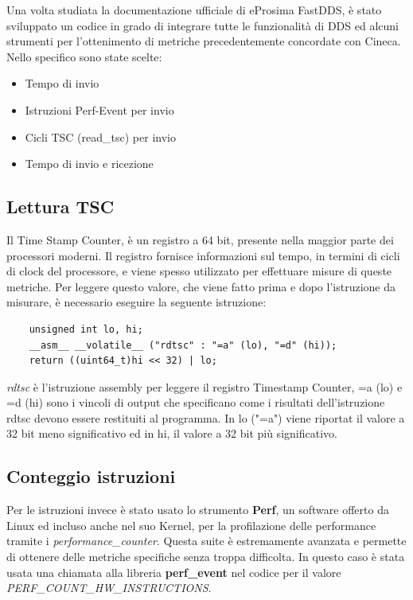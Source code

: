 Una volta studiata la documentazione ufficiale di eProsima FastDDS, è stato sviluppato un codice in grado di integrare tutte le funzionalità di DDS ed alcuni strumenti per l'ottenimento di metriche precedentemente concordate con Cineca\cite{TODO}. Nello specifico sono state scelte:
\begin{itemize}
    \item Tempo di invio
    \item Istruzioni Perf-Event per invio
    \item Cicli TSC (read\_tsc) per invio
    \item Tempo di invio e ricezione
\end{itemize}
\subsection{Lettura TSC}
Il Time Stamp Counter, è un registro a 64 bit, presente nella maggior parte dei processori moderni. Il registro fornisce informazioni sul tempo, in termini di cicli di clock del processore, e viene spesso utilizzato per effettuare misure di queste metriche. Per leggere questo valore, che viene fatto prima e dopo l'istruzione da misurare, è necessario eseguire la seguente istruzione:
\begin{verbatim}
    unsigned int lo, hi;
    __asm__ __volatile__ ("rdtsc" : "=a" (lo), "=d" (hi));
    return ((uint64_t)hi << 32) | lo; 
\end{verbatim}
\emph{rdtsc} è l'istruzione \gls{assembly} per leggere il registro Timestamp Counter, =a (lo) e =d (hi) sono i vincoli di output che specificano come i risultati dell'istruzione rdtsc devono essere restituiti al programma. In lo ("=a") viene riportat il valore a 32 bit meno significativo ed in hi, il valore a 32 bit più significativo.

\subsection{Conteggio istruzioni}
Per le istruzioni invece è stato usato lo strumento \textbf{Perf}, un software offerto da Linux ed incluso anche nel suo \gls{Kernel}, per la profilazione delle performance tramite i \emph{performance\_counter}. Questa suite è estremamente avanzata e permette di ottenere delle metriche specifiche senza troppa difficolta. In questo caso è stata usata una chiamata alla libreria \textbf{perf\_event} nel codice per il valore \emph{PERF\_COUNT\_HW\_INSTRUCTIONS}.

